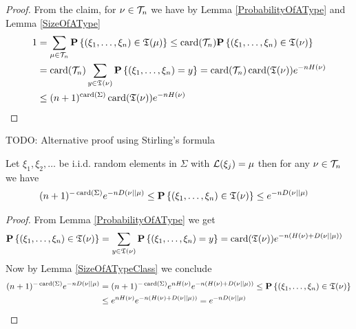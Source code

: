 \begin{proof}
From the claim, for $\nu \in \mathcal{T}_{n}$ we have by Lemma \ref{ProbabilityOfAType} and Lemma \ref{SizeOfAType}
\begin{align*}
1 &= \sum_{\mu \in \mathcal{T}_{n}} \textbf{P}\left \{(\xi_1,\dotsc, \xi_n) \in \mathfrak{T}(\mu) \right \} 
\leq \operatorname*{card}(\mathcal{T}_{n})  \textbf{P}\left \{(\xi_1,\dotsc, \xi_n) \in \mathfrak{T}(\nu) \right \} \\
&=\operatorname*{card}(\mathcal{T}_{n}) \sum_{y \in \mathfrak{T}(\nu)} \textbf{P}\left \{(\xi_1,\dotsc, \xi_n) = y \right \} 
= \operatorname*{card}(\mathcal{T}_{n}) \operatorname*{card}(\mathfrak{T}(\nu)) e^{-n H(\nu)} \\
&\leq (n+1)^{\operatorname*{card}(\Sigma)} \operatorname*{card}(\mathfrak{T}(\nu)) e^{-n H(\nu)}
\end{align*}
\end{proof}

TODO: Alternative proof using Stirling's formula

\begin{lem}\label{ProbabilityOfATypeClass}Let $\xi_1, \xi_2, \dotsc$ be i.i.d. random elements in $\Sigma$ with $\mathcal{L}(\xi_j) = \mu$ then for any $\nu \in \mathcal{T}_{n}$ we have
\begin{align*}
(n+1)^{-\operatorname*{card}(\Sigma)} e^{-n D\left( \nu \mid\mid \mu \right)} &\leq \textbf{P}\left \{(\xi_1, \dotsc,\xi_n) \in \mathfrak{T}(\nu) \right \} \leq e^{-n D\left( \nu \mid\mid \mu \right)}
\end{align*}
\end{lem}
\begin{proof}
From Lemma \ref{ProbabilityOfAType} we get
\begin{align*}
\textbf{P}\left \{(\xi_1, \dotsc,\xi_n) \in \mathfrak{T}(\nu) \right \} 
&= \sum_{y \in \mathfrak{T}(\nu)} \textbf{P}\left \{(\xi_1, \dotsc,\xi_n) = y \right \} 
= \operatorname*{card}(\mathfrak{T}(\nu)) e^{-n(H(\nu) +D\left( \nu \mid\mid \mu \right))}
\end{align*}
Now by Lemma \ref{SizeOfATypeClass} we conclude 
\begin{align*}
(n+1)^{-\operatorname*{card}(\Sigma)} e^{-nD\left( \nu \mid\mid \mu \right)}  
&= (n+1)^{-\operatorname*{card}(\Sigma)} e^{n H(\nu)} e^{-n(H(\nu) +D\left( \nu \mid\mid \mu \right))} 
\leq \textbf{P}\left \{(\xi_1, \dotsc,\xi_n) \in \mathfrak{T}(\nu) \right \} \\
&\leq e^{n H(\nu)} e^{-n(H(\nu) +D\left( \nu \mid\mid \mu \right))} = e^{-nD\left( \nu \mid\mid \mu \right)}
\end{align*}
\end{proof}

